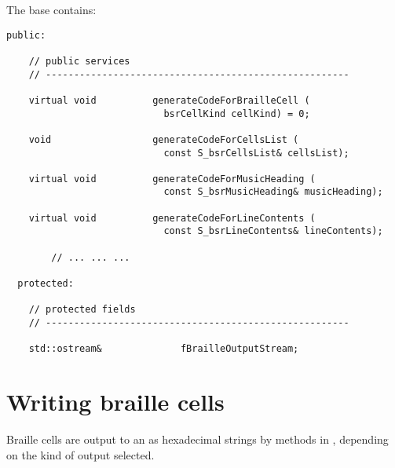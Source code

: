 The base  contains:
\begin{lstlisting}[language=CPlusPlus]
  public:

    // public services
    // ------------------------------------------------------

    virtual void          generateCodeForBrailleCell (
                            bsrCellKind cellKind) = 0;

    void                  generateCodeForCellsList (
                            const S_bsrCellsList& cellsList);

    virtual void          generateCodeForMusicHeading (
                            const S_bsrMusicHeading& musicHeading);

    virtual void          generateCodeForLineContents (
                            const S_bsrLineContents& lineContents);

		// ... ... ...

  protected:

    // protected fields
    // ------------------------------------------------------

    std::ostream&              fBrailleOutputStream;
\end{lstlisting}


\section{Writing braille cells}

Braille cells are output to an  as hexadecimal strings by  methods in , depending on the kind of output selected.

